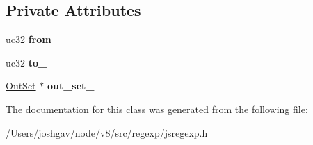 \subsection*{Private Attributes}
\begin{DoxyCompactItemize}
\item 
uc32 {\bfseries from\+\_\+}\hypertarget{classv8_1_1internal_1_1_dispatch_table_1_1_entry_a78513d0681646bbadfe280ea7ef334e1}{}\label{classv8_1_1internal_1_1_dispatch_table_1_1_entry_a78513d0681646bbadfe280ea7ef334e1}

\item 
uc32 {\bfseries to\+\_\+}\hypertarget{classv8_1_1internal_1_1_dispatch_table_1_1_entry_a759a1e58a75507119700079513318bce}{}\label{classv8_1_1internal_1_1_dispatch_table_1_1_entry_a759a1e58a75507119700079513318bce}

\item 
\hyperlink{classv8_1_1internal_1_1_out_set}{Out\+Set} $\ast$ {\bfseries out\+\_\+set\+\_\+}\hypertarget{classv8_1_1internal_1_1_dispatch_table_1_1_entry_ad9967e1ea39d1aeadb28a6d70fc809fe}{}\label{classv8_1_1internal_1_1_dispatch_table_1_1_entry_ad9967e1ea39d1aeadb28a6d70fc809fe}

\end{DoxyCompactItemize}


The documentation for this class was generated from the following file\+:\begin{DoxyCompactItemize}
\item 
/\+Users/joshgav/node/v8/src/regexp/jsregexp.\+h\end{DoxyCompactItemize}
